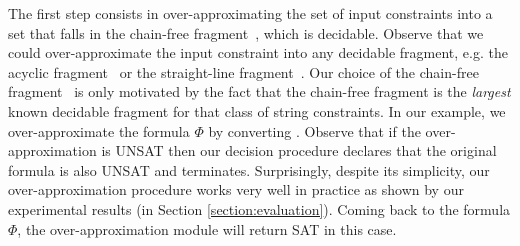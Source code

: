 \documentclass[sigplan,screen]{acmart}
\begin{document}
 The first step consists in over-approximating the set of input constraints into a set that falls in the chain-free fragment~\cite{abdulla2019chain}, which is decidable. Observe that we could  over-approximate the input constraint into any decidable fragment, e.g. the acyclic fragment~\cite{abdulla2014string} or the straight-line fragment~\cite{chen2019decision}. Our choice of the chain-free fragment~\cite{abdulla2019chain} is only motivated by the fact that the chain-free fragment is the {\em largest} known decidable fragment for that class of string constraints. In our example, we over-approximate the formula $\Phi$ by converting . 
Observe that if the over-approximation is UNSAT then our decision procedure  declares that the original formula is also UNSAT and terminates. Surprisingly, despite its simplicity, our over-approximation procedure works very well in practice as shown by our experimental results  (in Section \ref{section:evaluation}). Coming back to the formula $\Phi$, the over-approximation module will  return SAT  in this case. 
\end{document}
